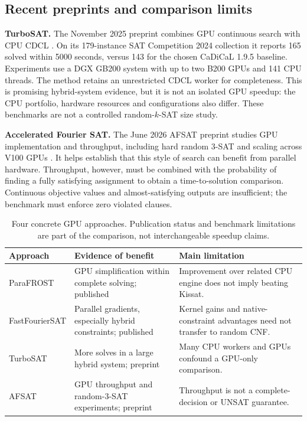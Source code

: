 \subsection{Recent preprints and comparison limits}
\textbf{TurboSAT.}
The November 2025 preprint combines GPU continuous search with CPU CDCL
\citep{dai2025}. On its 179-instance SAT Competition 2024 collection it
reports 165 solved within 5000 seconds, versus 143 for the chosen CaDiCaL
1.9.5 baseline. Experiments use a DGX GB200 system with up to two B200 GPUs
and 141 CPU threads. The method retains an unrestricted CDCL worker for
completeness. This is promising hybrid-system evidence, but it is not an
isolated GPU speedup: the CPU portfolio, hardware resources and configurations
also differ. These benchmarks are not a controlled random-$k$-SAT size study.

\textbf{Accelerated Fourier SAT.}
The June 2026 AFSAT preprint studies GPU implementation and throughput,
including hard random $3$-SAT and scaling across V100 GPUs
\citep{christopher2026}. It helps establish that this style of search can
benefit from parallel hardware. Throughput, however, must be combined with
the probability of finding a fully satisfying assignment to obtain a
time-to-solution comparison. Continuous objective values and almost-satisfying
outputs are insufficient; the benchmark must enforce zero violated clauses.

\begin{table}[htbp]
\centering\small
\begin{tabularx}{\linewidth}{@{}L{.27\linewidth}Y Y@{}}
\toprule
Approach & Evidence of benefit & Main limitation \\
\midrule
ParaFROST & GPU simplification within complete solving; published & Improvement over related CPU engine does not imply beating Kissat. \\
FastFourierSAT & Parallel gradients, especially hybrid constraints; published & Kernel gains and native-constraint advantages need not transfer to random CNF. \\
TurboSAT & More solves in a large hybrid system; preprint & Many CPU workers and GPUs confound a GPU-only comparison. \\
AFSAT & GPU throughput and random-$3$-SAT experiments; preprint & Throughput is not a complete-decision or UNSAT guarantee. \\
\bottomrule
\end{tabularx}
\caption{Four concrete GPU approaches. Publication status and benchmark
limitations are part of the comparison, not interchangeable speedup claims.}
\end{table}


